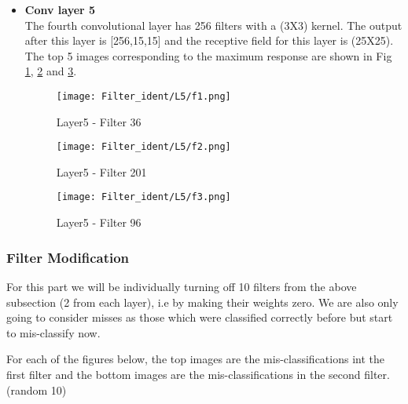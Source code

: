 \documentclass{article}
\begin{document}
\begin{itemize}
\newpage
\item \textbf{Conv layer 5} \\
\noindent
The fourth convolutional layer has 256 filters with a (3X3) kernel. The output after this layer is [256,15,15] and the receptive field for this layer is (25X25). The top 5 images corresponding to the maximum response are shown in Fig \ref{fig:l5_f1}, \ref{fig:l5_f2} and \ref{fig:l5_f3}. 
\begin{figure}[H]
    \centering
    \texttt{[image: Filter\_ident/L5/f1.png]}
    \vspace{-1.0em}
    \caption{Layer5 - Filter 36}
    \label{fig:l5_f1}
\end{figure}
\begin{figure}[H]
    \centering
    \texttt{[image: Filter\_ident/L5/f2.png]}
    \vspace{-1.0em}
    \caption{Layer5 - Filter 201}
    \label{fig:l5_f2}
\end{figure}
\begin{figure}[H]
    \centering
    \texttt{[image: Filter\_ident/L5/f3.png]}
    \vspace{-1.0em}
    \caption{Layer5 - Filter 96}
    \label{fig:l5_f3}
\end{figure}

\end{itemize}

\subsubsection{Filter Modification}

For this part we will be individually turning off 10 filters from the above subsection (2 from each layer), i.e by making their weights zero. We are also only going to consider misses as those which were classified correctly before but start to mis-classify now.

\noindent
For each of the figures below, the top images are the mis-classifications int the first filter and the bottom images are the mis-classifications in the second filter.(random 10)
\end{document}
